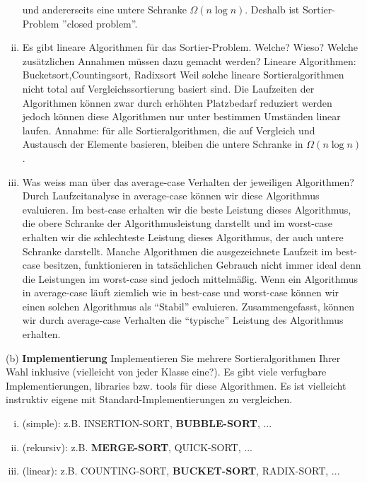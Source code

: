 \documentclass{article}
\begin{document}
\begin{flushleft}
\begin{enumerate}[(i)]
und andererseits eine untere Schranke $\Omega(n\log n)$. Deshalb ist Sortier-Problem ”closed problem”. 
\newpage
\item Es gibt lineare Algorithmen für das Sortier-Problem. Welche? Wieso? Welche zusätzlichen Annahmen 
müssen dazu gemacht werden?
\newline
Lineare Algorithmen: Bucketsort,Countingsort, Radixsort
\newline
Weil solche lineare Sortieralgorithmen nicht total auf Vergleichssortierung basiert sind. Die Laufzeiten der Algorithmen 
können zwar durch erhöhten Platzbedarf reduziert werden jedoch können diese Algorithmen nur unter bestimmen Umständen 
linear laufen.
\newline
Annahme: für alle Sortieralgorithmen, die auf Vergleich und Austausch der Elemente basieren, bleiben die untere Schranke in $\Omega(n\log n)$.
\item Was weiss man über das average-case Verhalten der jeweiligen Algorithmen? 
\newline
Durch Laufzeitanalyse in average-case können wir diese Algorithmus evaluieren. Im best-case erhalten wir die beste 
Leistung dieses Algorithmus, die obere Schranke der Algorithmusleistung darstellt und im worst-case erhalten wir 
die schlechteste Leistung dieses Algorithmus, der auch untere Schranke darstellt. Manche Algorithmen die ausgezeichnete Laufzeit 
im best-case besitzen, funktionieren in tatsächlichen Gebrauch nicht immer ideal denn die Leistungen im worst-case 
sind jedoch mittelmäßig. Wenn ein Algorithmus in average-case läuft ziemlich wie in best-case und worst-case können wir
einen solchen Algorithmus als ``Stabil” evaluieren. Zusammengefasst, können wir durch average-case Verhalten
die ``typische” Leistung des Algorithmus erhalten.
\end{enumerate}
(b) \textbf{Implementierung}
\newline
Implementieren Sie mehrere Sortieralgorithmen Ihrer Wahl inklusive (vielleicht von jeder
Klasse eine?). Es gibt viele verfugbare Implementierungen, libraries bzw. tools für diese Algorithmen. 
Es ist vielleicht instruktiv eigene mit Standard-Implementierungen zu vergleichen.
\begin{enumerate}[(i)]
\item (simple): z.B. INSERTION-SORT, \textbf{BUBBLE-SORT}, ...
\item (rekursiv): z.B. \textbf{MERGE-SORT}, QUICK-SORT, ...
\item (linear): z.B. COUNTING-SORT, \textbf{BUCKET-SORT}, RADIX-SORT, ...

\end{enumerate}
\end{flushleft}
\end{document}
